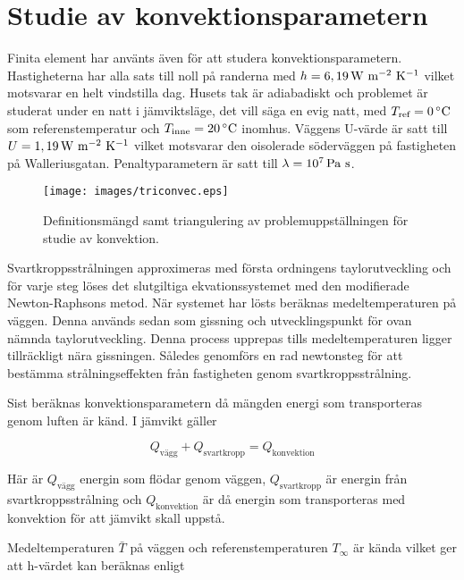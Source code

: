 \section{Studie av konvektionsparametern}

Finita element har använts även för att studera konvektionsparametern. Hastigheterna har alla
sats till noll på randerna med $h=\unit[6,19]{W~m^{-2}~K^{-1}}$ vilket motsvarar en helt vindstilla dag.
Husets tak är adiabadiskt
och problemet är studerat under en natt i jämviktsläge, det vill säga en evig natt, med
$T_\text{ref} = \unit[0]{^\circ C}$ som referenstemperatur och $T_\text{inne} = \unit[20]{^\circ C}$ inomhus.
Väggens U-värde är satt till $U = \unit[1,19]{W~m^{-2}~K^{-1}}$ vilket motsvarar den oisolerade söderväggen på fastigheten på Walleriusgatan. Penaltyparametern är satt till $\lambda = \unit[10^7]{Pa~s}$.

\begin{figure}
\centering
\texttt{[image: images/triconvec.eps]}
\caption{Definitionsmängd samt triangulering av problemuppställningen för studie av konvektion.}
\end{figure}

Svartkroppsstrålningen approximeras med första ordningens taylorutveckling och
för varje steg löses det slutgiltiga ekvationssystemet med den
modifierade Newton-Raphsons metod. När systemet har lösts beräknas
medeltemperaturen på väggen. Denna används sedan som gissning och utvecklingspunkt
för ovan nämnda taylorutveckling. Denna process upprepas tills medeltemperaturen
ligger tillräckligt nära gissningen. Således genomförs en rad newtonsteg
för att bestämma strålningseffekten från fastigheten genom svartkroppsstrålning.

Sist beräknas konvektionsparametern då mängden energi som transporteras
genom luften är känd. I jämvikt gäller

\begin{equation}
\label{eq:convectionmethod:balance}
Q_\text{vägg} + Q_\text{svartkropp} = Q_\text{konvektion}
\end{equation}

Här är $Q_\text{vägg}$ energin som flödar genom väggen, $Q_\text{svartkropp}$ är energin från
svartkroppsstrålning och $Q_\text{konvektion}$ är då energin som transporteras med konvektion
för att jämvikt skall uppstå.

Medeltemperaturen $\bar{T}$ på väggen och referenstemperaturen $T_\infty$ är kända
vilket ger att h-värdet kan beräknas enligt


